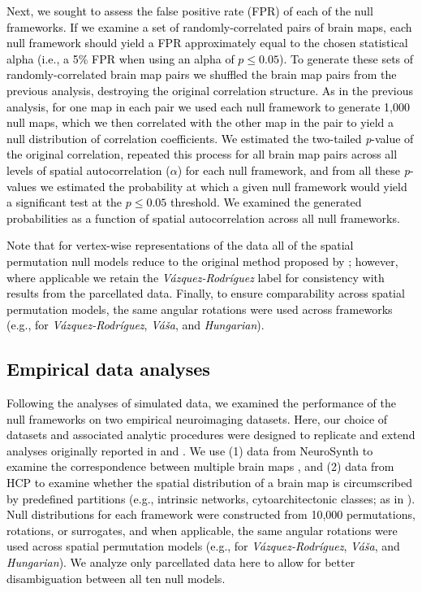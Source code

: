 \documentclass[12pt,aps,pra,reprint,showkeys]{revtex4-1}
\newcommand{\nimg}[1]{\textcolor{black}{{#1}}}
\begin{document}
\nimg{Next, we sought to assess the false positive rate (FPR) of each of the null frameworks.
If we examine a set of randomly-correlated pairs of brain maps, each null framework should yield a FPR approximately equal to the chosen statistical alpha (i.e., a 5\% FPR when using an alpha of $p \leq 0.05$).
To generate these sets of randomly-correlated brain map pairs we shuffled the brain map pairs from the previous analysis, destroying the original correlation structure.
As in the previous analysis, for one map in each pair we used each null framework to generate 1,000 null maps, which we then correlated with the other map in the pair to yield a null distribution of correlation coefficients.
We estimated the two-tailed \emph{p}-value of the original correlation, repeated this process for all brain map pairs across all levels of spatial autocorrelation ($\alpha$) for each null framework, and from all these \emph{p}-values we estimated the probability at which a given null framework would yield a significant test at the $p \leq 0.05$ threshold.
We examined the generated probabilities as a function of spatial autocorrelation across all null frameworks.}

\nimg{Note that for vertex-wise representations of the data all of the spatial permutation null models reduce to the original method proposed by \citet{alexanderbloch2018neuroimage}; however, where applicable we retain the \textit{V{\'a}zquez-Rodr{\'i}guez} label for consistency with results from the parcellated data.
Finally, to ensure comparability across spatial permutation models, the same angular rotations were used across frameworks (e.g., for \textit{V{\'a}zquez-Rodr{\'i}guez}, \textit{V{\'a}{\v{s}}a}, and \textit{Hungarian}).}

\subsection*{\nimg{Empirical data analyses}}

\nimg{Following the analyses of simulated data, we examined the performance of the null frameworks on two empirical neuroimaging datasets.
Here, our choice of datasets and associated analytic procedures were designed to replicate and extend analyses originally reported in \citet{alexanderbloch2018neuroimage} and \citet{burt2020neuroimage}.
We use (1) data from NeuroSynth to examine the correspondence between multiple brain maps \citep[as in][]{alexanderbloch2018neuroimage}, and (2) data from HCP to examine whether the spatial distribution of a brain map is circumscribed by predefined partitions (e.g., intrinsic networks, cytoarchitectonic classes; as in \citealt{burt2020neuroimage}).
Null distributions for each framework were constructed from 10,000 permutations, rotations, or surrogates, and when applicable, the same angular rotations were used across spatial permutation models (e.g., for \textit{V{\'a}zquez-Rodr{\'i}guez}, \textit{V{\'a}{\v{s}}a}, and \textit{Hungarian}).
We analyze only parcellated data here to allow for better disambiguation between all ten null models.}
\end{document}
